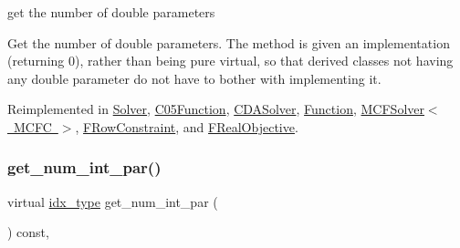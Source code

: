 get the number of double parameters 

Get the number of double parameters. The method is given an implementation (returning 0), rather than being pure virtual, so that derived classes not having any double parameter do not have to bother with implementing it. 

Reimplemented in \mbox{\hyperlink{class_s_m_spp__di__unipi__it_1_1_solver_a842fd454acaded84baf6b77e0d61a950}{Solver}}, \mbox{\hyperlink{class_s_m_spp__di__unipi__it_1_1_c05_function_a842fd454acaded84baf6b77e0d61a950}{C05\+Function}}, \mbox{\hyperlink{class_s_m_spp__di__unipi__it_1_1_c_d_a_solver_a842fd454acaded84baf6b77e0d61a950}{C\+D\+A\+Solver}}, \mbox{\hyperlink{class_s_m_spp__di__unipi__it_1_1_function_a842fd454acaded84baf6b77e0d61a950}{Function}}, \mbox{\hyperlink{class_s_m_spp__di__unipi__it_1_1_m_c_f_solver_a842fd454acaded84baf6b77e0d61a950}{M\+C\+F\+Solver$<$ M\+C\+F\+C $>$}}, \mbox{\hyperlink{class_s_m_spp__di__unipi__it_1_1_f_row_constraint_a842fd454acaded84baf6b77e0d61a950}{F\+Row\+Constraint}}, and \mbox{\hyperlink{class_s_m_spp__di__unipi__it_1_1_f_real_objective_a842fd454acaded84baf6b77e0d61a950}{F\+Real\+Objective}}.

\mbox{\label{class_s_m_spp__di__unipi__it_1_1_thin_compute_interface_a1e009f6b43f7966bf4b4740e0b4cff58}} 
\subsubsection{\texorpdfstring{get\+\_\+num\+\_\+int\+\_\+par()}{get\_num\_int\_par()}}
{\footnotesize\ttfamily virtual \mbox{\hyperlink{class_s_m_spp__di__unipi__it_1_1_thin_compute_interface_aa3d710629ad8c434286726ad810c3b47}{idx\+\_\+type}} get\+\_\+num\+\_\+int\+\_\+par (\begin{DoxyParamCaption}\item[{void}]{ }\end{DoxyParamCaption}) const\hspace{0.3cm}{\ttfamily [inline]}, {\ttfamily [virtual]}}



